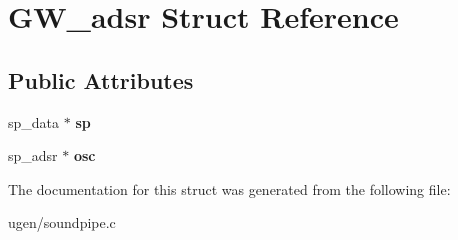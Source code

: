 \hypertarget{structGW__adsr}{}\section{G\+W\+\_\+adsr Struct Reference}
\label{structGW__adsr}
\subsection*{Public Attributes}
\begin{DoxyCompactItemize}
\item 
\hypertarget{structGW__adsr_ad8dc6d3c52ae7e2ffae269b2b04e8616}{}\label{structGW__adsr_ad8dc6d3c52ae7e2ffae269b2b04e8616} 
sp\+\_\+data $\ast$ {\bfseries sp}
\item 
\hypertarget{structGW__adsr_a667cfbc47341760963d05b35c55e1266}{}\label{structGW__adsr_a667cfbc47341760963d05b35c55e1266} 
sp\+\_\+adsr $\ast$ {\bfseries osc}
\end{DoxyCompactItemize}


The documentation for this struct was generated from the following file\+:\begin{DoxyCompactItemize}
\item 
ugen/soundpipe.\+c\end{DoxyCompactItemize}
